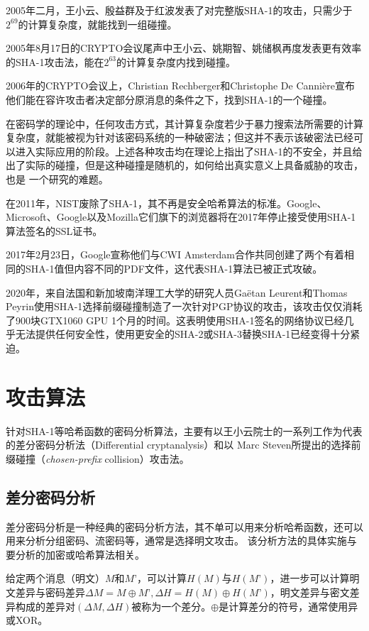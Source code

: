 2005年二月，王小云、殷益群及于红波发表了对完整版SHA-1的攻击\cite{wang2005finding}，只需少于$2^{69}$的计算复杂度，就能找到一组碰撞。

2005年8月17日的CRYPTO会议尾声中王小云、姚期智、姚储枫再度发表更有效率的SHA-1攻击法，能在$2^{63}$的计算复杂度内找到碰撞。

2006年的CRYPTO会议上，Christian Rechberger和Christophe De Cannière宣布他们能在容许攻击者决定部分原消息的条件之下，找到SHA-1的一个碰撞\cite{10.1007/11935230_1}。

在密码学的理论中，任何攻击方式，其计算复杂度若少于暴力搜索法所需要的计算复杂度，就能被视为针对该密码系统的一种破密法；但这并不表示该破密法已经可以进入实际应用的阶段。上述各种攻击均在理论上指出了SHA-1的不安全，并且给出了实际的碰撞，但是这种碰撞是随机的，如何给出真实意义上具备威胁的攻击，也是
一个研究的难题。

在2011年，NIST废除了SHA-1，其不再是安全哈希算法的标准。Google、Microsoft、Google以及Mozilla它们旗下的浏览器将在2017年停止接受使用SHA-1算法签名的SSL证书。

2017年2月23日，Google宣称他们与CWI Amsterdam合作共同创建了两个有着相同的SHA-1值但内容不同的PDF文件\cite{stevens2017first}，这代表SHA-1算法已被正式攻破。

2020年，来自法国和新加坡南洋理工大学的研究人员Gaëtan Leurent和Thomas Peyrin使用SHA-1选择前缀碰撞制造了一次针对PGP协议的攻击\cite{leurent2020sha}，该攻击仅仅消耗了900块GTX1060 GPU 1个月的时间。这表明使用SHA-1签名的网络协议已经几乎无法提供任何安全性，使用更安全的SHA-2或SHA-3替换SHA-1已经变得十分紧迫。


\section{攻击算法}

针对SHA-1等哈希函数的密码分析算法，主要有以王小云院士的一系列工作为代表的差分密码分析法（Differential cryptanalysis）和以
Marc Steven所提出的选择前缀碰撞（\textit{chosen-prefix} collision\cite{stevens2007chosen}）攻击法。

\subsection{差分密码分析}

差分密码分析是一种经典的密码分析方法，其不单可以用来分析哈希函数，还可以用来分析分组密码、流密码等，通常是选择明文攻击。
该分析方法的具体实施与要分析的加密或哈希算法相关。

给定两个消息（明文）$M$和$M’$，可以计算$H(M)$与$H(M’)$，进一步可以计算明文差异与密码差异$\Delta M=M \oplus M’, \Delta H=H(M) \oplus H(M’)$，明文差异与密文差异构成的差异对$(\Delta M, \Delta H)$被称为一个差分。$\oplus$是计算差分的符号，通常使用异或XOR。

